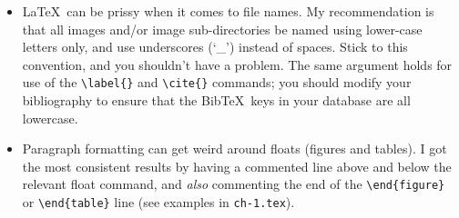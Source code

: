 \begin{itemize}
\item \LaTeX~can be prissy when it comes to file names. My recommendation is that all images and/or image sub-directories be named using lower-case letters only, and use underscores (`\_') instead of spaces. Stick to this convention, and you shouldn't have a problem. The same argument holds for use of the \verb+\label{}+ and \verb+\cite{}+ commands; you should modify your bibliography to ensure that the Bib\TeX~keys in your database are all lowercase.

\item Paragraph formatting can get weird around floats (figures and tables). I got the most consistent results by having a commented line above and below the relevant float command, and {\em also} commenting the end of the \verb+\end{figure}+ or \verb+\end{table}+ line (see examples in \verb+ch-1.tex+).

\end{itemize}

%
%
\cleardoublepage
\renewcommand\bibname{References}


\cleardoublepage
%